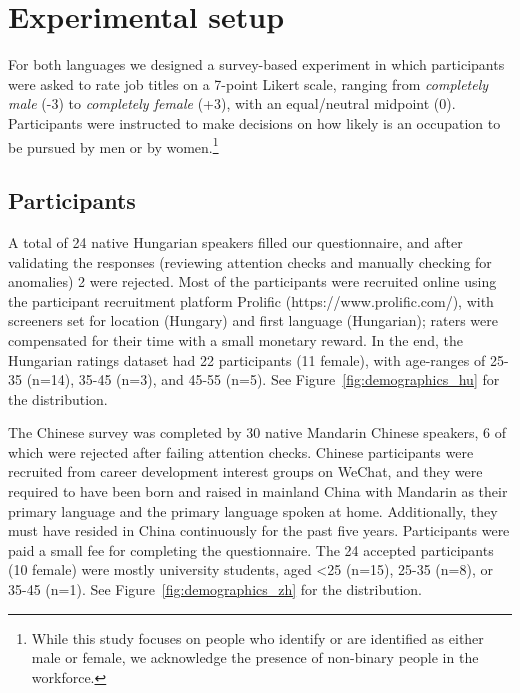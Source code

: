 \documentclass[11pt]{article}
\begin{document}
\section{Experimental setup}\label{sec:experiment_setup}

For both languages we designed a survey-based experiment in which participants were asked to rate job titles on a 7-point Likert scale, ranging from \textit{completely male} (-3) to \textit{completely female} (+3), with an equal/neutral midpoint (0). Participants were instructed to make decisions on how likely is an occupation to be pursued by men or by women.\footnote{While this study focuses on people who identify or are identified as either male or female, we acknowledge the presence of non-binary people in the workforce.}

\subsection{Participants}


A total of 24 native Hungarian speakers filled our questionnaire, and after validating the responses (reviewing attention checks and manually checking for anomalies) 2 were rejected. Most of the participants were recruited online using the participant recruitment platform Prolific (https://www.prolific.com/), with screeners set for location (Hungary) and first language (Hungarian); raters were compensated for their time with a small monetary reward. In the end, the Hungarian ratings dataset had 22 participants (11 female), with age-ranges of 25-35 (n=14), 35-45 (n=3), and 45-55 (n=5). See Figure~\ref{fig:demographics_hu} for the distribution.


The Chinese survey was completed by 30 native Mandarin Chinese speakers, 6 of which were rejected after failing attention checks. Chinese participants were recruited from career development interest groups on WeChat, and they were required to have been born and raised in mainland China with Mandarin as their primary language and the primary language spoken at home. Additionally, they must have resided in China continuously for the past five years. Participants were paid a small fee for completing the questionnaire. The 24 accepted participants (10 female) were mostly university students, aged <25 (n=15), 25-35 (n=8), or 35-45 (n=1). See Figure~\ref{fig:demographics_zh} for the distribution.
\end{document}
